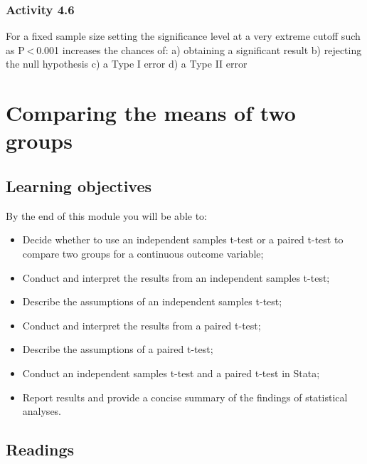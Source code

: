 \documentclass[
]{memoir}
\providecommand{\tightlist}{%
  \setlength{\itemsep}{0pt}\setlength{\parskip}{0pt}}
\begin{document}
\hypertarget{activity-4.6}{%
\subsection{Activity 4.6}\label{activity-4.6}}

For a fixed sample size setting the significance level at a very extreme cutoff such as P \textless{} 0.001 increases the chances of:
a) obtaining a significant result
b) rejecting the null hypothesis
c) a Type I error
d) a Type II error

\hypertarget{comparing-the-means-of-two-groups}{%
\chapter{Comparing the means of two groups}\label{comparing-the-means-of-two-groups}}

\hypertarget{learning-objectives-4}{%
\section*{Learning objectives}\label{learning-objectives-4}}

By the end of this module you will be able to:

\begin{itemize}
\tightlist
\item
  Decide whether to use an independent samples t-test or a paired t-test to compare two groups for a continuous outcome variable;
\item
  Conduct and interpret the results from an independent samples t-test;
\item
  Describe the assumptions of an independent samples t-test;
\item
  Conduct and interpret the results from a paired t-test;
\item
  Describe the assumptions of a paired t-test;
\item
  Conduct an independent samples t-test and a paired t-test in Stata;
\item
  Report results and provide a concise summary of the findings of statistical analyses.
\end{itemize}

\hypertarget{readings-4}{%
\section*{Readings}\label{readings-4}}
\end{document}
